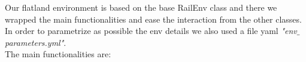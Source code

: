 Our flatland environment is based on the base RailEnv class and there we wrapped the main functionalities and ease the interaction from the other classes. In order to parametrize as possible the env details we also used a file yaml \textit{"env$\_$parameters.yml"}.\\
The main functionalities are:

